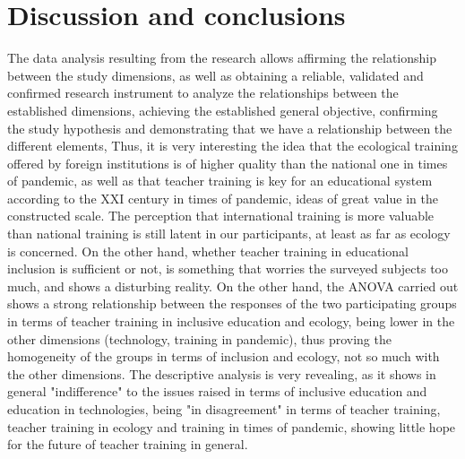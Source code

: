 \documentclass{textolivre}
\begin{document}
\section{Discussion and conclusions}
The data analysis resulting from the research allows affirming the relationship between the study dimensions, as well as obtaining a reliable, validated and confirmed research instrument to analyze the relationships between the established dimensions, achieving the established general objective, confirming the study hypothesis and demonstrating that we have a relationship between the different elements, Thus, it is very interesting the idea that the ecological training offered by foreign institutions is of higher quality than the national one in times of pandemic, as well as that teacher training is key for an educational system according to the XXI century in times of pandemic, ideas of great value in the constructed scale. The perception that international training is more valuable than national training is still latent in our participants, at least as far as ecology is concerned. On the other hand, whether teacher training in educational inclusion is sufficient or not, is something that worries the surveyed subjects too much, and shows a disturbing reality. On the other hand, the ANOVA carried out shows a strong relationship between the responses of the two participating groups in terms of teacher training in inclusive education and ecology, being lower in the other dimensions (technology, training in pandemic), thus proving the homogeneity of the groups in terms of inclusion and ecology, not so much with the other dimensions. The descriptive analysis is very revealing, as it shows in general "indifference" to the issues raised in terms of inclusive education and education in technologies, being "in disagreement" in terms of teacher training, teacher training in ecology and training in times of pandemic, showing little hope for the future of teacher training in general.
\end{document}
